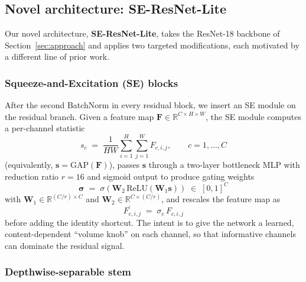 \documentclass[conference,10pt]{IEEEtran}
\begin{document}
\subsection{Novel architecture: SE-ResNet-Lite}
\label{sec:se-resnet-lite}

Our novel architecture, \textbf{SE-ResNet-Lite}, takes the ResNet-18
backbone of Section~\ref{sec:approach} and applies two targeted
modifications, each motivated by a different line of prior work.

\subsubsection*{Squeeze-and-Excitation (SE) blocks~\cite{hu2018squeeze}}

After the second BatchNorm in every residual block, we insert an SE
module on the residual branch. Given a feature map
$\mathbf{F}\!\in\!\mathbb{R}^{C\times H\times W}$, the SE module
computes a per-channel statistic
\begin{equation}
  s_c \;=\; \frac{1}{HW}\sum_{i=1}^{H}\sum_{j=1}^{W} F_{c,i,j},
  \qquad c = 1,\dots,C
\end{equation}
(equivalently, $\mathbf{s}=\textrm{GAP}(\mathbf{F})$), passes
$\mathbf{s}$ through a two-layer bottleneck MLP with reduction ratio
$r\!=\!16$ and sigmoid output to produce gating weights
\begin{equation}
  \boldsymbol{\sigma} \;=\; \sigma\!\left(\mathbf{W}_2\,\textrm{ReLU}(\mathbf{W}_1\mathbf{s})\right) \;\in\; [0,1]^{C}
\end{equation}
with $\mathbf{W}_1\!\in\!\mathbb{R}^{(C/r)\times C}$ and
$\mathbf{W}_2\!\in\!\mathbb{R}^{C\times(C/r)}$, and rescales the
feature map as
\begin{equation}
  F^{\prime}_{c,i,j} \;=\; \sigma_c\,F_{c,i,j}
\end{equation}
before adding the identity shortcut.  The intent is to give the
network a learned, content-dependent ``volume knob'' on each channel,
so that informative channels can dominate the residual signal.

\subsubsection*{Depthwise-separable stem~\cite{howard2017mobilenets}}
\end{document}
